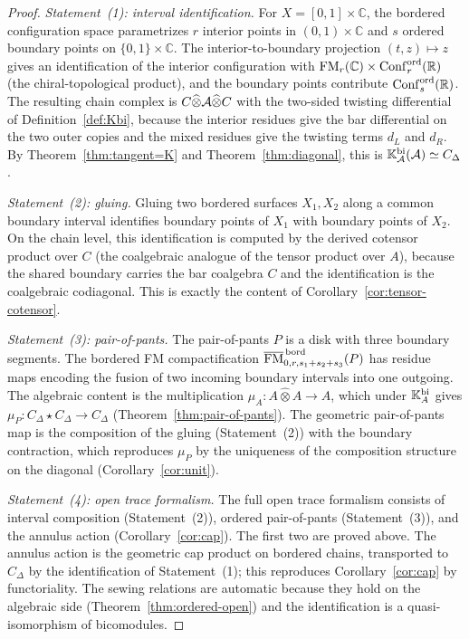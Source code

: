 \begin{proof}
\emph{Statement~(1): interval identification.}
For $X=[0,1]\times\mathbb C$, the bordered configuration space
parametrizes $r$ interior points in
$(0,1)\times\mathbb C$ and $s$ ordered boundary points on
$\{0,1\}\times\mathbb C$. The interior-to-boundary projection
$(t,z)\mapsto z$ gives an identification of the interior
configuration with
$\mathrm{FM}_r(\mathbb C)\times\mathrm{Conf}_r^{\mathrm{ord}}(\mathbb R)$
(the chiral-topological product), and the boundary points
contribute $\mathrm{Conf}_s^{\mathrm{ord}}(\mathbb R)$.
The resulting chain complex is
$C\widehat\otimes\mathcal{A}\widehat\otimes C$ with the two-sided
twisting differential of Definition~\ref{def:Kbi}, because
the interior residues give the bar differential on the two
outer copies and the mixed residues give the twisting terms
$d_L$ and $d_R$. By Theorem~\ref{thm:tangent=K} and
Theorem~\ref{thm:diagonal}, this is $\mathbb{K}_{\mathcal{A}}^{\mathrm{bi}}(\mathcal{A})
\simeq C_\Delta$.

\emph{Statement~(2): gluing.}
Gluing two bordered surfaces $X_1,X_2$ along a common boundary
interval identifies boundary points of $X_1$ with boundary
points of $X_2$. On the chain level, this identification is
computed by the derived cotensor product over $C$ (the
coalgebraic analogue of the tensor product over $A$),
because the shared boundary carries the bar coalgebra $C$ and
the identification is the coalgebraic codiagonal. This is
exactly the content of Corollary~\ref{cor:tensor-cotensor}.

\emph{Statement~(3): pair-of-pants.}
The pair-of-pants $P$ is a disk with three boundary segments.
The bordered FM compactification
$\overline{\mathrm{FM}}^{\,\mathrm{bord}}_{0,r,s_1+s_2+s_3}(P)$
has residue maps encoding the fusion of two incoming boundary
intervals into one outgoing. The algebraic content is the
multiplication $\mu_A\colon A\widehat\otimes A\to A$, which
under $\mathbb{K}_A^{\mathrm{bi}}$ gives
$\mu_P\colon C_\Delta\star C_\Delta\to C_\Delta$
(Theorem~\ref{thm:pair-of-pants}). The geometric pair-of-pants
map is the composition of the gluing (Statement~(2)) with the
boundary contraction, which reproduces $\mu_P$ by the
uniqueness of the composition structure on the diagonal
(Corollary~\ref{cor:unit}).

\emph{Statement~(4): open trace formalism.}
The full open trace formalism consists of interval composition
(Statement~(2)), ordered pair-of-pants (Statement~(3)),
and the annulus action (Corollary~\ref{cor:cap}). The first
two are proved above. The annulus action is the geometric cap
product on bordered chains, transported to $C_\Delta$ by the
identification of Statement~(1); this reproduces
Corollary~\ref{cor:cap} by functoriality. The sewing relations
are automatic because they hold on the algebraic side
(Theorem~\ref{thm:ordered-open}) and the identification is a
quasi-isomorphism of bicomodules.
\end{proof}

